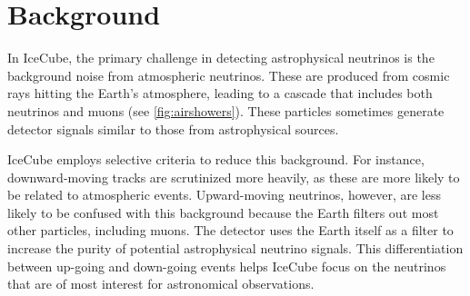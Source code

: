 \section{Background}

In IceCube, the primary challenge in detecting astrophysical neutrinos is the background noise from atmospheric neutrinos.
These are produced from cosmic rays hitting the Earth's atmosphere, leading to a cascade that includes both neutrinos and muons (see \cref{fig:airshowers}).
These particles sometimes generate detector signals similar to those from astrophysical sources.

IceCube employs selective criteria to reduce this background.
For instance, downward-moving tracks are scrutinized more heavily, as these are more likely to be related to atmospheric events.
Upward-moving neutrinos, however, are less likely to be confused with this background because the Earth filters out most other particles, including muons.
The detector uses the Earth itself as a filter to increase the purity of potential astrophysical neutrino signals.
This differentiation between up-going and down-going events helps IceCube focus on the neutrinos that are of most interest for astronomical observations.